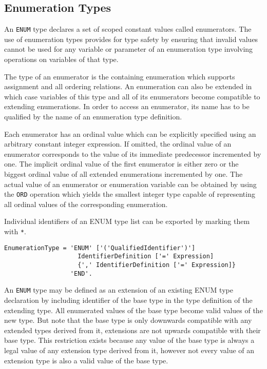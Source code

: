\documentclass[a4wide,11pt]{article}
\begin{document}
\subsection{Enumeration Types}

An \lstinline"ENUM" type declares a set of scoped constant values called enumerators.
The use of enumeration types provides for type safety by ensuring that invalid values cannot be used for any variable or parameter of an enumeration type involving operations on variables of that type.

The type of an enumerator is the containing enumeration which supports assignment and all ordering relations.
An enumeration can also be extended in which case variables of this type and all of its enumerators become compatible to extending enumerations.
In order to access an enumerator, its name has to be qualified by the name of an enumeration type definition.

Each enumerator has an ordinal value which can be explicitly specified using an arbitrary constant integer expression.
If omitted, the ordinal value of an enumerator corresponds to the value of its immediate predecessor incremented by one.
The implicit ordinal value of the first enumerator is either zero or the biggest ordinal value of all extended enumerations incremented by one.
The actual value of an enumerator or enumeration variable can be obtained by using the \lstinline"ORD" operation which yields the smallest integer type capable of representing all ordinal values of the corresponding enumeration.


Individual identifiers of an ENUM type list can be exported by marking them with \lstinline"*".

\begin{lstlisting}[style=ebnf]
EnumerationType = 'ENUM' ['('QualifiedIdentifier')']
                    IdentifierDefinition ['=' Expression]
                    {',' IdentifierDefinition ['=' Expression]}
                  'END'.
\end{lstlisting}

An \lstinline"ENUM" type may be defined as an extension of an existing ENUM type declaration by including identifier of the base type in the type definition of the extending type.
All enumerated values of the base type become valid values of the new type.
But note that the base type is only downwards compatible with any extended types derived from it, extensions are not upwards compatible with their base type.
This restriction exists because any value of the base type is always a legal value of any extension type derived from it, however not every value of an extension type is also a valid value of the base type.
\end{document}
